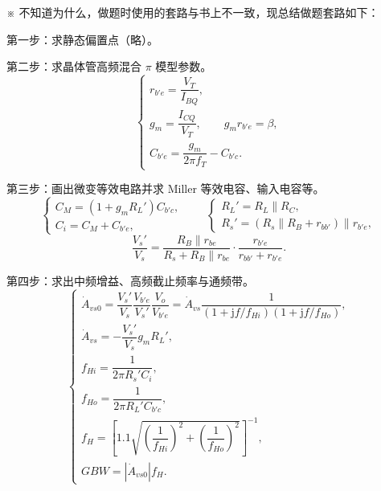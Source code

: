 \documentclass[UTF8,fontset=fandol,zihao=5]{ctexart}
\newcommand{\jj}{\mathrm{j}}
\newcommand{\parallelsum}{\mathbin{\|}}
\begin{document}
\begin{methodbox}[【题型】求晶体管共射放大电路高频特性]
※ 不知道为什么，做题时使用的套路与书上不一致，现总结做题套路如下：

第一步：求静态偏置点（略）。

第二步：求晶体管高频混合 $\pi$ 模型参数。
\[
  \begin{cases}
    r_{b'e}=\dfrac{V_T}{I_{BQ}},\\[3pt]
    g_m=\dfrac{I_{CQ}}{V_T},\qquad g_mr_{b'e}=\beta,\\[3pt]
    C_{b'e}=\dfrac{g_m}{2\pi f_T}-C_{b'c}.
  \end{cases}
\]

第三步：画出微变等效电路并求 Miller 等效电容、输入电容等。
\[
  \begin{cases}
    C_M=(1+g_mR_L')C_{b'c},\\
    C_i=C_M+C_{b'e},
  \end{cases}
  \qquad
  \begin{cases}
    R_L'=R_L\parallelsum R_C,\\
    R_s'=(R_s\parallelsum R_B+r_{bb'})\parallelsum r_{b'e},
  \end{cases}
\]
\[
  \frac{V_s'}{V_s}=\frac{R_B\parallelsum r_{be}}{R_s+R_B\parallelsum r_{be}}
  \cdot\frac{r_{b'e}}{r_{bb'}+r_{b'e}}.
\]

第四步：求出中频增益、高频截止频率与通频带。
\[
\begin{cases}
\dot A_{vs0}=\dfrac{V_s'}{V_s}\dfrac{V_{b'e}}{V_s'}\dfrac{V_o}{V_{b'e}}
=\dot A_{vs}\dfrac1{(1+\jj f/f_{Hi})(1+\jj f/f_{Ho})},\\[5pt]
\dot A_{vs}=-\dfrac{V_s'}{V_s}g_mR_L',\\[5pt]
f_{Hi}=\dfrac1{2\pi R_s'C_i},\\[5pt]
f_{Ho}=\dfrac1{2\pi R_L'C_{b'c}},\\[5pt]
f_H=\left[1.1\sqrt{\left(\dfrac1{f_{Hi}}\right)^2+\left(\dfrac1{f_{Ho}}\right)^2}\right]^{-1},\\[5pt]
GBW=|\dot A_{vs0}|f_H.
\end{cases}
\]
\end{methodbox}
\latechapters
\end{document}
